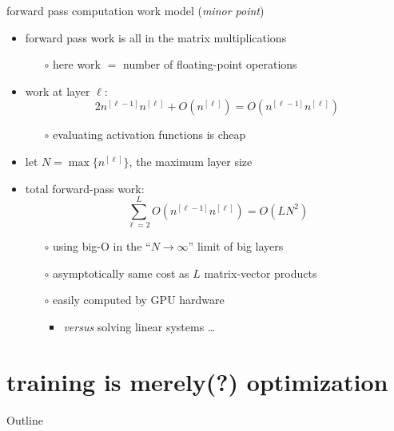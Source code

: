\documentclass[xcolor={svgnames},
               hyperref={colorlinks,citecolor=DeepPink4,linkcolor=FireBrick,urlcolor=Maroon}]
               {beamer}
\begin{document}
\begin{frame}{forward pass computation work model (\emph{minor point})}

\begin{itemize}
\item forward pass work is all in the matrix multiplications
    \begin{itemize}
    \item[$\circ$] here work $=$ number of floating-point operations
    \end{itemize}
\item work at layer $\ell$:
    $$2 n^{[\ell-1]} n^{[\ell]} + O(n^{[\ell]}) = O(n^{[\ell-1]} n^{[\ell]})$$

    \begin{itemize}
    \item[$\circ$] evaluating activation functions is cheap
    \end{itemize}
\item let $N=\max\{n^{[\ell]}\}$, the maximum layer size
\item total forward-pass work:
    $$\sum_{\ell=2}^L O(n^{[\ell-1]} n^{[\ell]}) = O(L N^2)$$

    \begin{itemize}
    \item[$\circ$] using big-O in the ``$N\to\infty$'' limit of big layers
    \item[$\circ$] asymptotically same cost as $L$ matrix-vector products
    \item[$\circ$] easily computed by GPU hardware
        \begin{itemize}
        \item \emph{versus} solving linear systems \dots
        \end{itemize}
    \end{itemize}
\end{itemize}
\end{frame}


\section{training is merely(?) optimization}

\begin{frame}{Outline}
\end{frame}
\end{document}
